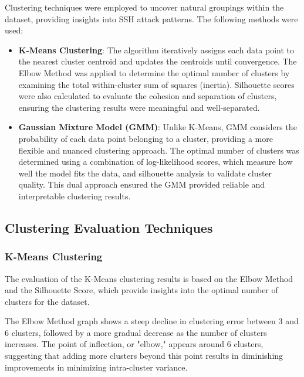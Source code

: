         Clustering techniques were employed to uncover natural groupings within the dataset, providing insights into SSH attack patterns. The following methods were used:
        
        \begin{itemize}
        
            \item \textbf{K-Means Clustering}: The algorithm iteratively assigns each data point to the nearest cluster centroid and updates the centroids until convergence. The Elbow Method was applied to determine the optimal number of clusters by examining the total within-cluster sum of squares (inertia). Silhouette scores were also calculated to evaluate the cohesion and separation of clusters, ensuring the clustering results were meaningful and well-separated.
            
            \item \textbf{Gaussian Mixture Model (GMM)}: Unlike K-Means, GMM considers the probability of each data point belonging to a cluster, providing a more flexible and nuanced clustering approach. The optimal number of clusters was determined using a combination of log-likelihood scores, which measure how well the model fits the data, and silhouette analysis to validate cluster quality. This dual approach ensured the GMM provided reliable and interpretable clustering results.
            
        \end{itemize}
        
    \subsection{Clustering Evaluation Techniques}
    
        \subsubsection{K-Means Clustering \\}
            
            The evaluation of the K-Means clustering results is based on the Elbow Method and the Silhouette Score, which provide insights into the optimal number of clusters for the dataset.

            The Elbow Method graph shows a steep decline in clustering error between 3 and 6 clusters, followed by a more gradual decrease as the number of clusters increases. The point of inflection, or "elbow," appears around 6 clusters, suggesting that adding more clusters beyond this point results in diminishing improvements in minimizing intra-cluster variance.


